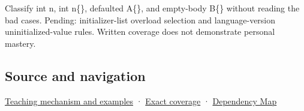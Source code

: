 Classify int n, int n\{\}, defaulted A\{\}, and empty-body B\{\} without reading the bad cases. Pending: initializer-list overload selection and language-version uninitialized-value rules. Written coverage does not demonstrate personal mastery.

\subsection{Source and navigation}\label{appendix-ba8c1a9fe03f-source-and-navigation}

\hyperref[01-foundations-i-ch003-empty-syntax-does-not-promise-initialized-members]{Teaching mechanism and examples} · \hyperref[appendix-fd090d982a15-m009---parts-127-147]{Exact coverage} · \hyperref[appendix-4ad47bdd269a]{Dependency Map}
